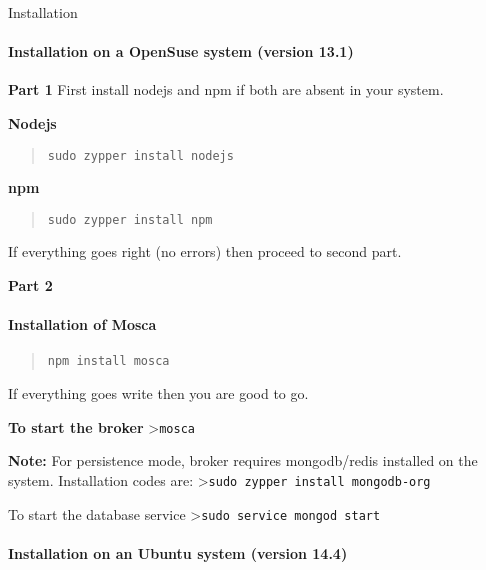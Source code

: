 \documentclass[16pt]{article}
\begin{document}
\begin{enumerate}
\begin{enumerate}
\end{enumerate}

{\Large{Installation}}


\paragraph{Installation on a OpenSuse system (version
13.1)}

\textbf{Part 1} First install nodejs and npm if both are absent in your
system.

\textbf{Nodejs}

\begin{quote}
\texttt{sudo zypper install nodejs}
\end{quote}

\textbf{npm}

\begin{quote}
\texttt{sudo zypper install npm}
\end{quote}

If everything goes right (no errors) then proceed to second part.

\textbf{Part 2}

\paragraph{Installation of Mosca}

\begin{quote}
\texttt{npm install mosca}
\end{quote}

If everything goes write then you are good to go.

\textbf{To start the broker} \textgreater{}\texttt{mosca}

\textbf{Note:} For persistence mode, broker requires mongodb/redis
installed on the system. Installation codes are:
\textgreater{}\texttt{sudo zypper install mongodb-org}

To start the database service
\textgreater{}\texttt{sudo service mongod start}


\paragraph{Installation on an Ubuntu system (version
14.4)}


\end{enumerate}
\end{document}
